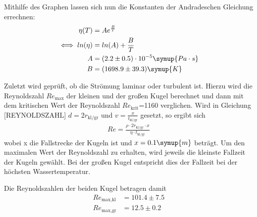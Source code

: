 Mithilfe des Graphen lassen sich nun die Konstanten der 
Andradeschen Gleichung errechnen:
\begin{equation*}
\begin{aligned}
\eta(T) &= Ae^{\frac{B}{T}} \\
\iff ln(\eta) &= ln(A) + \frac{B}{T} \\
A &= (2.2 \pm 0.5)\cdot 10^{-5} \symup{Pa \cdot s} \\
B &= (1698.9 \pm 39.3) \symup{K} \\
\end{aligned}
\end{equation*}

\newpage
Zuletzt wird geprüft, ob die Strömung laminar oder turbulent ist. Hierzu wird die Reynoldszahl $Re_{\text{max}}$ der kleinen und der großen Kugel berechnet und dann mit dem kritischen Wert der 
Reynoldszahl $Re_{\text{krit}}$=1160 verglichen.
Wird in Gleichung [REYNOLDSZAHL] $d=2r_{\text{kl/gr}}$ und $v=\frac{x}{t_{\text{kl/gr}}}$ gesetzt, so ergibt sich
\begin{equation}
\begin{aligned}
Re = \frac{\rho \cdot 2r_{\text{kl/gr}} \cdot x}{\eta \cdot t_{\text{kl/gr}}}
\end{aligned}
\end{equation}
wobei x die Fallstrecke der Kugeln ist und $x=0.1\symup{m}$ \cite[3]{anleitung107} beträgt. Um den maximalen Wert der Reynoldszahl zu erhalten, wird jeweils die kleinste Fallzeit der Kugeln gewählt. Bei der 
großen Kugel entspricht dies der Fallzeit bei der höchsten Wassertemperatur.

Die Reynoldszahlen der beiden Kugel betragen damit
\begin{equation*}
\begin{aligned}
Re_{\text{max,kl}} &= 101.4 \pm 7.5 \\
Re_{\text{max,gr}} &= 12.5 \pm 0.2
\end{aligned}
\end{equation*}

